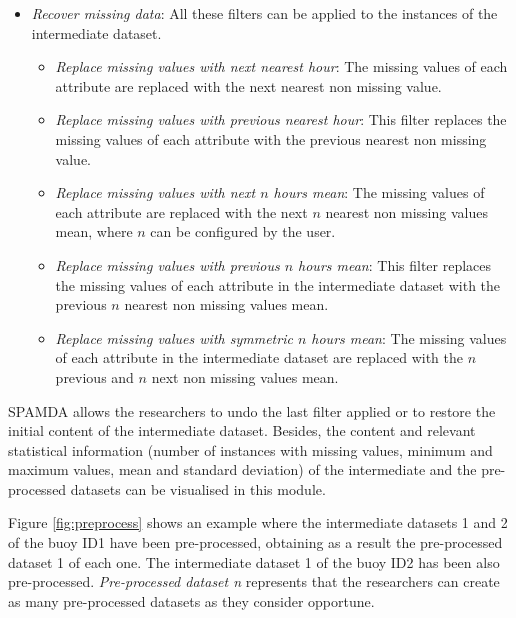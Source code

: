 \documentclass[energies,article,submit,moreauthors,pdftex]{Definitions/mdpi}
\begin{document}
\begin{itemize}[leftmargin=*,labelsep=5.8mm]
				 \item \textit{Recover missing data}: All these filters can be applied to the instances of the intermediate dataset.
					\begin{itemize}[leftmargin=*,labelsep=5.8mm]
						\item \textit{Replace missing values with next nearest hour}: The missing values of each attribute are replaced with the next nearest non missing value.
						\item \textit{Replace missing values with previous nearest hour}: This filter replaces the missing values of each attribute with the previous nearest non missing value.
						\item \textit{Replace missing values with next $n$ hours mean}: The missing values of each attribute are replaced with the next $n$ nearest non missing values mean, where $n$ can be configured by the user.
						\item \textit{Replace missing values with previous $n$ hours mean}: This filter replaces the missing values of each attribute in the intermediate dataset with the previous $n$ nearest non missing values mean.
						\item \textit{Replace missing values with symmetric $n$ hours mean}: The missing values of each attribute in the intermediate dataset are replaced with the $n$ previous and $n$ next non missing values mean.
					\end{itemize}
				 
				\end{itemize}
				
				SPAMDA allows the researchers to undo the last filter applied or to restore the initial content of the intermediate dataset. Besides, the content and relevant statistical information (number of instances with missing values, minimum and maximum values, mean and standard deviation) of the intermediate and the pre-processed datasets can be visualised in this module.
				
				Figure \ref{fig:preprocess} shows an example where the intermediate datasets 1 and 2 of the buoy ID1 have been pre-processed, obtaining as a result the pre-processed dataset 1 of each one. The intermediate dataset 1 of the buoy ID2 has been also pre-processed. \textit{Pre-processed dataset n} represents that the researchers can create as many pre-processed datasets as they consider opportune.
				
\end{document}
